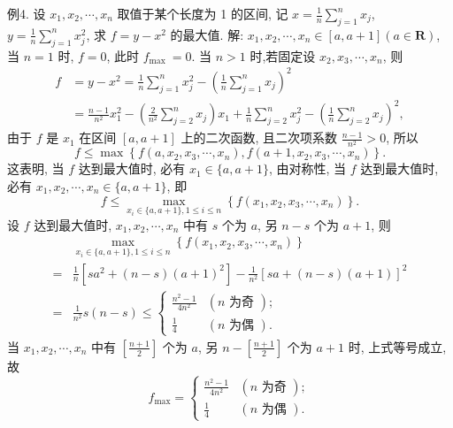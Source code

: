 例4. 设 $x_1, x_2, \cdots, x_n$ 取值于某个长度为 1 的区间, 记 $x=\frac{1}{n} \sum_{j=1}^n x_j$, $y=\frac{1}{n} \sum_{j=1}^n x_j^2$, 求 $f=y-x^2$ 的最大值.
解: $x_1, x_2, \cdots, x_n \in[a, a+1](a \in \mathbf{R})$, 当 $n=1$ 时, $f=0$, 此时 $f_{\text {max }}=0$.
当 $n>1$ 时,若固定设 $x_2, x_3, \cdots, x_n$, 则
$$
\begin{aligned}
f & =y-x^2=\frac{1}{n} \sum_{j=1}^n x_j^2-\left(\frac{1}{n} \sum_{j=1}^n x_j\right)^2 \\
& =\frac{n-1}{n^2} x_1^2-\left(\frac{2}{n^2} \sum_{j=2}^n x_j\right) x_1+\frac{1}{n} \sum_{j=2}^n x_j^2-\left(\frac{1}{n} \sum_{j=2}^n x_j\right)^2,
\end{aligned}
$$
由于 $f$ 是 $x_1$ 在区间 $[a, a+1]$ 上的二次函数, 且二次项系数 $\frac{n-1}{n^2}>0$, 所以
$$
f \leqslant \max \left\{f\left(a, x_2, x_3, \cdots, x_n\right), f\left(a+1, x_2, x_3, \cdots, x_n\right)\right\} .
$$
这表明, 当 $f$ 达到最大值时, 必有 $x_1 \in\{a, a+1\}$, 由对称性, 当 $f$ 达到最大值时, 必有 $x_1, x_2, \cdots, x_n \in\{a, a+1\}$, 即
$$
f \leqslant \max _{x_i \in\{a, a+1\}, 1 \leqslant i \leqslant n}\left\{f\left(x_1, x_2, x_3, \cdots, x_n\right)\right\} .
$$
设 $f$ 达到最大值时, $x_1, x_2, \cdots, x_n$ 中有 $s$ 个为 $a$, 另 $n-s$ 个为 $a+1$, 则
$$
\begin{aligned}
& \max _{x_i \in\{a, a+1\}, 1 \leqslant i \leqslant n}\left\{f\left(x_1, x_2, x_3, \cdots, x_n\right)\right\} \\
= & \frac{1}{n}\left[s a^2+(n-s)(a+1)^2\right]-\frac{1}{n^2}[s a+(n-s)(a+1)]^2 \\
= & \frac{1}{n^2} s(n-s) \leqslant\left\{\begin{array}{cl}
\frac{n^2-1}{4 n^2} & (n \text { 为奇 }) ; \\
\frac{1}{4} & (n \text { 为偶 }) .
\end{array}\right.
\end{aligned}
$$
当 $x_1, x_2, \cdots, x_n$ 中有 $\left[\frac{n+1}{2}\right]$ 个为 $a$, 另 $n-\left[\frac{n+1}{2}\right]$ 个为 $a+1$ 时, 上式等号成立, 故
$$
f_{\max }=\left\{\begin{array}{cl}
\frac{n^2-1}{4 n^2} & (n \text { 为奇 }) ; \\
\frac{1}{4} & (n \text { 为偶 }) .
\end{array}\right.
$$



